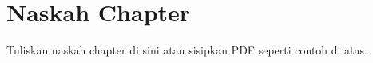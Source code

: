 \documentclass[proposal-bookchapter]{unnes-ta_plus}
\begin{document}
\maketitleunnes
\unnesPersetujuanPembimbing

\tableofcontents
\unnesMainMatter

\chapter{Naskah Chapter}
% 
Tuliskan naskah chapter di sini atau sisipkan PDF seperti contoh di atas.
\end{document}
